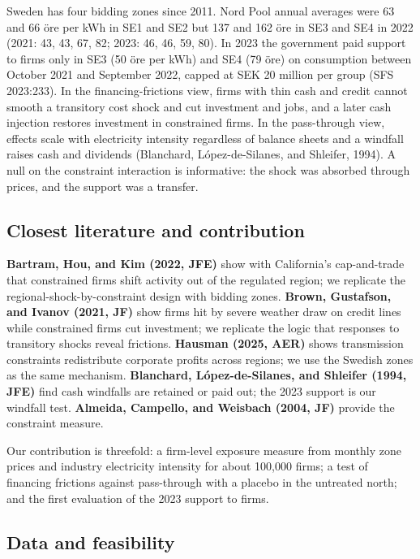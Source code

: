 \documentclass[12pt,a4paper]{article}
\begin{document}
Sweden has four bidding zones since 2011. Nord Pool annual averages were 63 and 66 öre per kWh in SE1 and SE2 but 137 and 162 öre in SE3 and SE4 in 2022 (2021: 43, 43, 67, 82; 2023: 46, 46, 59, 80). In 2023 the government paid support to firms only in SE3 (50 öre per kWh) and SE4 (79 öre) on consumption between October 2021 and September 2022, capped at SEK 20 million per group (SFS 2023:233). In the financing-frictions view, firms with thin cash and credit cannot smooth a transitory cost shock and cut investment and jobs, and a later cash injection restores investment in constrained firms. In the pass-through view, effects scale with electricity intensity regardless of balance sheets and a windfall raises cash and dividends (Blanchard, L\'opez-de-Silanes, and Shleifer, 1994). A null on the constraint interaction is informative: the shock was absorbed through prices, and the support was a transfer.

\subsection{Closest literature and contribution}

\textbf{Bartram, Hou, and Kim (2022, JFE)} show with California's cap-and-trade that constrained firms shift activity out of the regulated region; we replicate the regional-shock-by-constraint design with bidding zones. \textbf{Brown, Gustafson, and Ivanov (2021, JF)} show firms hit by severe weather draw on credit lines while constrained firms cut investment; we replicate the logic that responses to transitory shocks reveal frictions. \textbf{Hausman (2025, AER)} shows transmission constraints redistribute corporate profits across regions; we use the Swedish zones as the same mechanism. \textbf{Blanchard, L\'opez-de-Silanes, and Shleifer (1994, JFE)} find cash windfalls are retained or paid out; the 2023 support is our windfall test. \textbf{Almeida, Campello, and Weisbach (2004, JF)} provide the constraint measure.

Our contribution is threefold: a firm-level exposure measure from monthly zone prices and industry electricity intensity for about 100,000 firms; a test of financing frictions against pass-through with a placebo in the untreated north; and the first evaluation of the 2023 support to firms.

\subsection{Data and feasibility}
\end{document}
